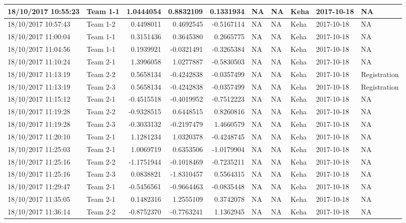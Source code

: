 \documentclass[]{article}
\begin{document}
\begin{tabular}{l|l|r|r|r|l|l|l|l|l}
\hline
18/10/2017 10:55:23 & Team 1-1 & 1.0444054 & 0.8832109 & 0.1331934 & NA & NA & Keha & 2017-10-18 & NA\\
\hline
18/10/2017 10:57:43 & Team 1-2 & 0.4498011 & 0.4692545 & -0.5167114 & NA & NA & Keha & 2017-10-18 & NA\\
\hline
18/10/2017 11:00:04 & Team 1-1 & 0.3151436 & 0.3645380 & 0.2665775 & NA & NA & Keha & 2017-10-18 & NA\\
\hline
18/10/2017 11:04:56 & Team 1-1 & 0.1939921 & -0.0321491 & -0.3265384 & NA & NA & Keha & 2017-10-18 & NA\\
\hline
18/10/2017 11:10:24 & Team 2-1 & 1.3996058 & 1.0277887 & -0.5830503 & NA & NA & Keha & 2017-10-18 & NA\\
\hline
18/10/2017 11:13:19 & Team 2-2 & 0.5658134 & -0.4242838 & -0.0357499 & NA & NA & Keha & 2017-10-18 & Registration\\
\hline
18/10/2017 11:13:19 & Team 2-3 & 0.5658134 & -0.4242838 & -0.0357499 & NA & NA & Keha & 2017-10-18 & Registration\\
\hline
18/10/2017 11:15:12 & Team 2-1 & -0.4515518 & -0.4019952 & -0.7512223 & NA & NA & Keha & 2017-10-18 & NA\\
\hline
18/10/2017 11:19:28 & Team 2-2 & -0.9328515 & 0.6448515 & 0.8260816 & NA & NA & Keha & 2017-10-18 & NA\\
\hline
18/10/2017 11:19:28 & Team 2-3 & -0.3033132 & -0.2197479 & 1.4660579 & NA & NA & Keha & 2017-10-18 & NA\\
\hline
18/10/2017 11:20:10 & Team 2-1 & 1.1281234 & 1.0320378 & -0.4248745 & NA & NA & Keha & 2017-10-18 & NA\\
\hline
18/10/2017 11:25:03 & Team 2-1 & 1.0069719 & 0.6353506 & -1.0179904 & NA & NA & Keha & 2017-10-18 & NA\\
\hline
18/10/2017 11:25:16 & Team 2-2 & -1.1751944 & -0.1018469 & -0.7235211 & NA & NA & Keha & 2017-10-18 & NA\\
\hline
18/10/2017 11:25:16 & Team 2-3 & 0.0838821 & -1.8310457 & 0.5564315 & NA & NA & Keha & 2017-10-18 & NA\\
\hline
18/10/2017 11:29:47 & Team 2-1 & -0.5456561 & -0.9664463 & -0.0835448 & NA & NA & Keha & 2017-10-18 & NA\\
\hline
18/10/2017 11:35:05 & Team 2-1 & 0.1482316 & 1.2555109 & 0.3742078 & NA & NA & Keha & 2017-10-18 & NA\\
\hline
18/10/2017 11:36:14 & Team 2-2 & -0.8752370 & -0.7763241 & 1.1362945 & NA & NA & Keha & 2017-10-18 & NA\\

\end{tabular}
\end{document}
